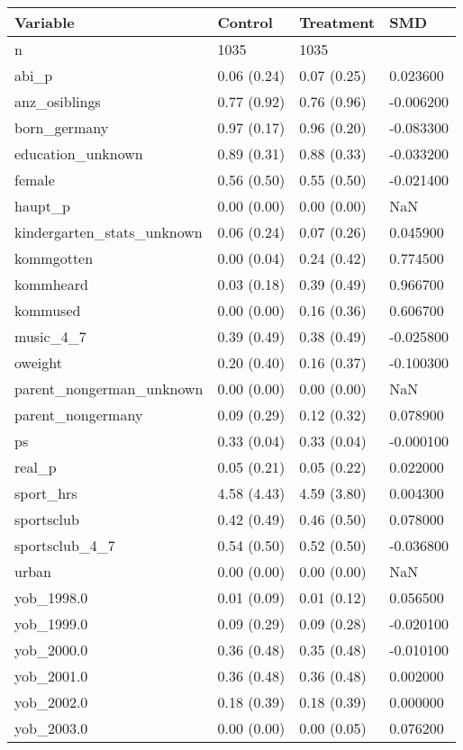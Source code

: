 \begin{tabular}{llll}
\toprule
Variable & Control & Treatment & SMD \\
\midrule
n & 1035 & 1035 &  \\
abi\_p & 0.06 (0.24) & 0.07 (0.25) & 0.023600 \\
anz\_osiblings & 0.77 (0.92) & 0.76 (0.96) & -0.006200 \\
born\_germany & 0.97 (0.17) & 0.96 (0.20) & -0.083300 \\
education\_unknown & 0.89 (0.31) & 0.88 (0.33) & -0.033200 \\
female & 0.56 (0.50) & 0.55 (0.50) & -0.021400 \\
haupt\_p & 0.00 (0.00) & 0.00 (0.00) & NaN \\
kindergarten\_stats\_unknown & 0.06 (0.24) & 0.07 (0.26) & 0.045900 \\
kommgotten & 0.00 (0.04) & 0.24 (0.42) & 0.774500 \\
kommheard & 0.03 (0.18) & 0.39 (0.49) & 0.966700 \\
kommused & 0.00 (0.00) & 0.16 (0.36) & 0.606700 \\
music\_4\_7 & 0.39 (0.49) & 0.38 (0.49) & -0.025800 \\
oweight & 0.20 (0.40) & 0.16 (0.37) & -0.100300 \\
parent\_nongerman\_unknown & 0.00 (0.00) & 0.00 (0.00) & NaN \\
parent\_nongermany & 0.09 (0.29) & 0.12 (0.32) & 0.078900 \\
ps & 0.33 (0.04) & 0.33 (0.04) & -0.000100 \\
real\_p & 0.05 (0.21) & 0.05 (0.22) & 0.022000 \\
sport\_hrs & 4.58 (4.43) & 4.59 (3.80) & 0.004300 \\
sportsclub & 0.42 (0.49) & 0.46 (0.50) & 0.078000 \\
sportsclub\_4\_7 & 0.54 (0.50) & 0.52 (0.50) & -0.036800 \\
urban & 0.00 (0.00) & 0.00 (0.00) & NaN \\
yob\_1998.0 & 0.01 (0.09) & 0.01 (0.12) & 0.056500 \\
yob\_1999.0 & 0.09 (0.29) & 0.09 (0.28) & -0.020100 \\
yob\_2000.0 & 0.36 (0.48) & 0.35 (0.48) & -0.010100 \\
yob\_2001.0 & 0.36 (0.48) & 0.36 (0.48) & 0.002000 \\
yob\_2002.0 & 0.18 (0.39) & 0.18 (0.39) & 0.000000 \\
yob\_2003.0 & 0.00 (0.00) & 0.00 (0.05) & 0.076200 \\
\bottomrule
\end{tabular}
